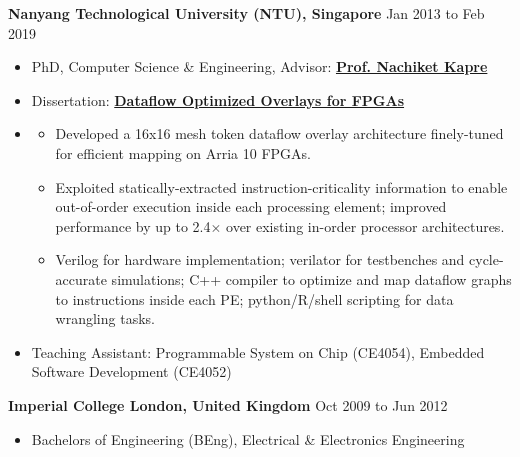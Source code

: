 \documentclass[10pt]{article}
\newenvironment{outerlist}[1][\enskip\textbullet]%
        {\begin{itemize}[#1,leftmargin=*]}{\end{itemize}%
         \vspace{-.6\baselineskip}}
\newenvironment{innerlist}[1][\enskip\textbullet]%
        {\begin{itemize}[#1,leftmargin=*,parsep=0pt,itemsep=0pt,topsep=0pt,partopsep=0pt]}
        {\end{itemize}}
\newenvironment{myinnerlist}[1][\enskip\textbullet]%
        {\begin{itemize}[#1,leftmargin=*,parsep=0pt,itemsep=3pt,topsep=0pt,partopsep=0pt]}
        {\end{itemize}\vspace{.6\baselineskip}}
\newcommand{\localtextbulletone}{\textcolor{gray}{\raisebox{.45ex}{\rule{.8ex}{.8ex}}}}
\begin{document}
{
    \hspace*{-\marginparsep minus \marginparwidth}%
    \begin{minipage}[t]{\textwidth+\marginparwidth+\marginparsep}%

        {\textbf{Nanyang Technological University (NTU), Singapore}} \hfill {Jan 2013 to Feb 2019}

        \vspace{0.1in}
        \begin{innerlist}
            \item[] PhD, {Computer Science \& Engineering},
                Advisor: \href{https://nachiket.github.io/}{\bf Prof. Nachiket Kapre}
            \item[] Dissertation: \href{https://dr.ntu.edu.sg/handle/10220/47803}{\bf Dataflow Optimized Overlays for FPGAs}
            \item[]
                \begin{myinnerlist}
                \renewcommand{\labelitemi}{\localtextbulletone}
                \item Developed a 16x16 mesh token dataflow overlay
                    architecture finely-tuned for efficient mapping on Arria 10
                    FPGAs.
                \item Exploited statically-extracted instruction-criticality
                    information to enable out-of-order execution inside each
                    processing element; improved performance by up to
                    2.4$\times$ over existing in-order processor architectures.
                \item Verilog for hardware implementation; verilator for
                    testbenches and cycle-accurate simulations; C++ compiler to
                    optimize and map dataflow graphs to instructions inside
                    each PE; python/R/shell scripting for data wrangling tasks.
            \end{myinnerlist}
            \vspace{-0.06in}
            \item[] Teaching Assistant: Programmable System on Chip (CE4054), Embedded Software Development (CE4052)
        \end{innerlist}

        \vspace{.1in}
        {\textbf{Imperial College London, United Kingdom}} \hfill {Oct 2009 to Jun 2012}
        \begin{outerlist}
        \item[] Bachelors of Engineering (BEng), {Electrical \& Electronics Engineering}
        \end{outerlist}


\end{minipage}}
\end{document}
